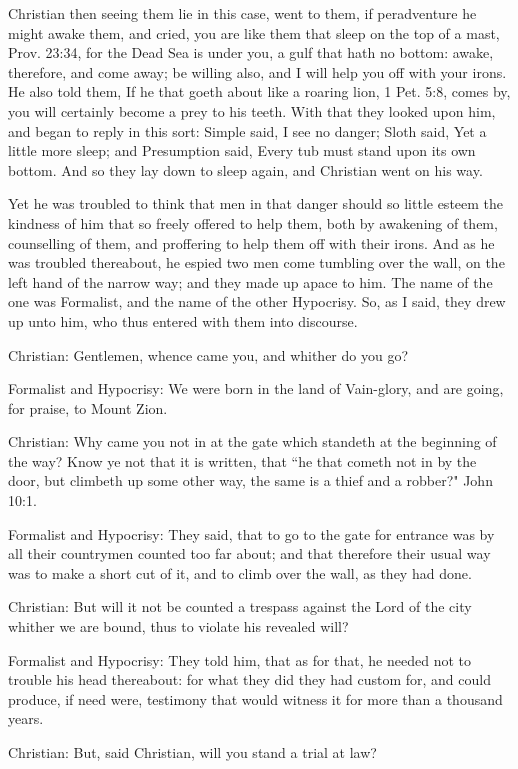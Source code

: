 Christian then seeing them lie in this case, went to them, if peradventure he might awake them, and cried, you are like them that sleep on the top of a mast, Prov. 23:34, for the Dead Sea is under you, a gulf that hath no bottom: awake, therefore, and come away; be willing also, and I will help you off with your irons. He also told them, If he that goeth about like a roaring lion, 1 Pet. 5:8, comes by, you will certainly become a prey to his teeth. With that they looked upon him, and began to reply in this sort: Simple said, I see no danger; Sloth said, Yet a little more sleep; and Presumption said, Every tub must stand upon its own bottom. And so they lay down to sleep again, and Christian went on his way.

Yet he was troubled to think that men in that danger should so little esteem the kindness of him that so freely offered to help them, both by awakening of them, counselling of them, and proffering to help them off with their irons. And as he was troubled thereabout, he espied two men come tumbling over the wall, on the left hand of the narrow way; and they made up apace to him. The name of the one was Formalist, and the name of the other Hypocrisy. So, as I said, they drew up unto him, who thus entered with them into discourse.

Christian: Gentlemen, whence came you, and whither do you go?

Formalist and Hypocrisy: We were born in the land of Vain-glory, and are going, for praise, to Mount Zion.

Christian: Why came you not in at the gate which standeth at the beginning of the way? Know ye not that it is written, that ``he that cometh not in by the door, but climbeth up some other way, the same is a thief and a robber?" John 10:1.

Formalist and Hypocrisy: They said, that to go to the gate for entrance was by all their countrymen counted too far about; and that therefore their usual way was to make a short cut of it, and to climb over the wall, as they had done.

Christian: But will it not be counted a trespass against the Lord of the city whither we are bound, thus to violate his revealed will?

Formalist and Hypocrisy: They told him, that as for that, he needed not to trouble his head thereabout: for what they did they had custom for, and could produce, if need were, testimony that would witness it for more than a thousand years.

Christian: But, said Christian, will you stand a trial at law?

